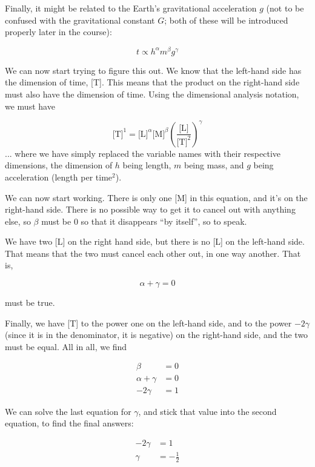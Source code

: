\documentclass[8.01x]{subfiles}
\begin{document}
Finally, it might be related to the Earth's gravitational acceleration $g$ (not to be confused with the gravitational constant $G$; both of these will be introduced properly later in the course):

\begin{equation}
t \propto h^\alpha m^\beta g^\gamma
\end{equation}

We can now start trying to figure this out. We know that the left-hand side has the dimension of time, [T]. This means that the product on the right-hand side must also have the dimension of time. Using the dimensional analysis notation, we must have

\begin{equation}
 \text{[T]}^1 = \text{[L]}^\alpha \text{[M]}^\beta \left( \frac{\text{[L]}}{\text{[T]}^2} \right)^\gamma 
 \end{equation}
 ... where we have simply replaced the variable names with their respective dimensions, the dimension of $h$ being length, $m$ being mass, and $g$ being acceleration (length per time${}^2$).
 
 We can now start working. There is only one [M] in this equation, and it's on the right-hand side. There is no possible way to get it to cancel out with anything else, so $\beta$ must be 0 so that it disappears ``by itself'', so to speak.
 
 We have two [L] on the right hand side, but there is no [L] on the left-hand side. That means that the two must cancel each other out, in one way another. That is,
 
\begin{equation*}
 \alpha + \gamma = 0
\end{equation*}

must be true.

Finally, we have [T] to the power one on the left-hand side, and to the power $-2\gamma$ (since it is in the denominator, it is negative) on the right-hand side, and the two must be equal. All in all, we find

\begin{align*}
\beta &= 0\\
\alpha + \gamma &= 0\\
-2\gamma &= 1
\end{align*}

We can solve the last equation for $\gamma$, and stick that value into the second equation, to find the final answers:

\begin{align*}
-2\gamma &= 1\\
\gamma &= -\frac{1}{2}
\end{align*}
\end{document}
